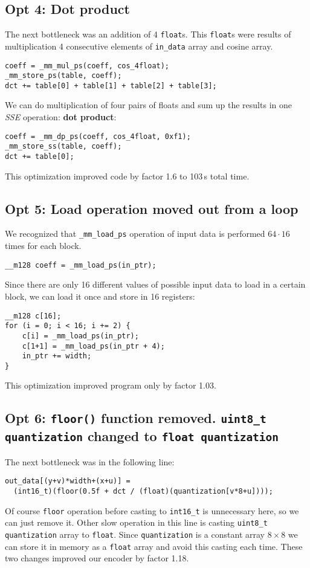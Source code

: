 \documentclass[11pt]{article}
\begin{document}
\subsection{Opt 4: Dot product}
The next bottleneck was an addition of 4 \texttt{float}s.
This \texttt{float}s were results of multiplication 4 consecutive elements
of \texttt{in\_data} array and cosine array.
\begin{lstlisting}
coeff = _mm_mul_ps(coeff, cos_4float);
_mm_store_ps(table, coeff);
dct += table[0] + table[1] + table[2] + table[3];
\end{lstlisting}
We can do multiplication of four pairs of floats and sum up the results
in one \emph{SSE} operation: \textbf{dot product}:
\begin{lstlisting}
coeff = _mm_dp_ps(coeff, cos_4float, 0xf1);
_mm_store_ss(table, coeff);
dct += table[0];
\end{lstlisting}
This optimization improved code by factor 1.6 to 103\,s total time.

\subsection{Opt 5: Load operation moved out from a loop}
We recognized that \texttt{\_mm\_load\_ps} operation of input data 
is performed $64 \cdot 16$ times for each block.
\begin{lstlisting}
__m128 coeff = _mm_load_ps(in_ptr);
\end{lstlisting}
Since there are only 16 different values of possible input data to load
in a certain block, we can load it once and store in 16 registers:
\begin{lstlisting}
__m128 c[16];
for (i = 0; i < 16; i += 2) {
    c[i] = _mm_load_ps(in_ptr);
    c[1+1] = _mm_load_ps(in_ptr + 4);
    in_ptr += width;
}
\end{lstlisting}
This optimization improved program only by factor 1.03.

\subsection{Opt 6: \texttt{floor()} function removed. 
\texttt{uint8\_t quantization} changed to \texttt{float quantization}}
The next bottleneck was in the following line:
\begin{lstlisting}
out_data[(y+v)*width+(x+u)] = 
  (int16_t)(floor(0.5f + dct / (float)(quantization[v*8+u])));
\end{lstlisting}
Of course \texttt{floor} operation before casting to \texttt{int16\_t}
is unnecessary here, so we can just remove it.
Other slow operation in this line is casting \texttt{uint8\_t quantization} array to \texttt{float}.
Since \texttt{quantization} is a constant array $8 \times 8$ we can store it
in memory as a \texttt{float} array and avoid this casting each time.
These two changes improved our encoder by factor 1.18.
\end{document}
